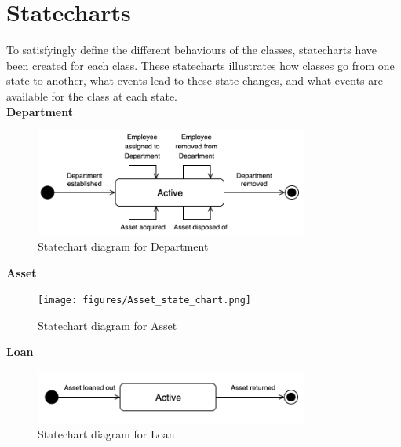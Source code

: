 \section{Statecharts}
To satisfyingly define the different behaviours of the classes, statecharts have been created for each class. These statecharts illustrates how classes go from one state to another, what events lead to these state-changes, and what events are available for the class at each state.\\

\Large  \textbf{Department}  \normalsize
\par
\begin{figure}[H]
    \centering
    \includegraphics[width=0.8\textwidth]{figures/department_state_chart.png}
    \caption{Statechart diagram for Department}
    \label{fig:department_statechart}
\end{figure}
\newline

\Large  \textbf{Asset}  \normalsize
\par
\begin{figure}[H]
    \centering
    \texttt{[image: figures/Asset\_state\_chart.png]}
    \caption{Statechart diagram for Asset}
    \label{fig:asset_statechart}
\end{figure}



\Large  \textbf{Loan}  \normalsize
\par
\begin{figure}[H]
    \centering
    \includegraphics[width=0.8\textwidth]{figures/Loan_state_chart.png}
    \caption{Statechart diagram for Loan}
    \label{fig:loan_statechart}
\end{figure}


